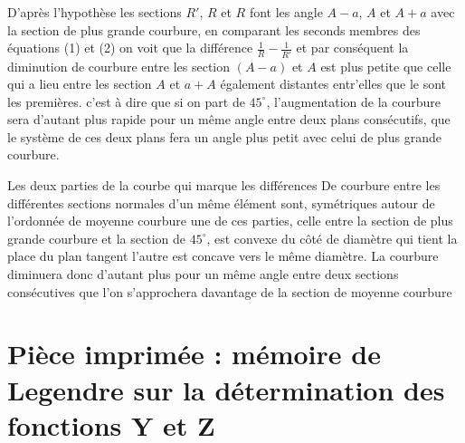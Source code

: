 \documentclass[11pt,a4paper]{article}
\begin{document}

D'après l'hypothèse les sections $R'$, $R$ et $R$ font les angle $A - a$,
$A$ et $A + a$ avec la section de plus grande courbure, en comparant les
seconds membres des  équations (1) et (2) on voit que la
différence $\frac{1}{R} - \frac{1}{R'}$ et par conséquent la diminution de
courbure entre les section $(A - a)$ et $A$ est plus petite que celle qui
a lieu entre les section $A$ et $a + A$ également distantes entr'elles que
le sont les premières. c'est à dire que  si on part de
$45^\circ$, l'augmentation de la courbure sera d'autant plus rapide pour
un même angle entre deux plans consécutifs, que le système de ces deux
plans fera un angle plus petit avec celui de plus grande courbure.

Les deux parties de la courbe qui marque les différences De courbure
entre les différentes sections normales d'un même élément sont,
symétriques autour de l'ordonnée de moyenne courbure une de ces parties,
celle entre la section de plus grande courbure et la section de $45^\circ$,
est convexe du côté de  diamètre qui tient la place du plan
tangent l'autre est concave vers le même diamètre. La courbure diminuera
donc d'autant plus pour un même angle entre deux sections consécutives que
l'on s'approchera davantage de  la section de moyenne
courbure

\section{Pièce imprimée : mémoire de Legendre sur la détermination des fonctions Y et Z}

\end{document}
